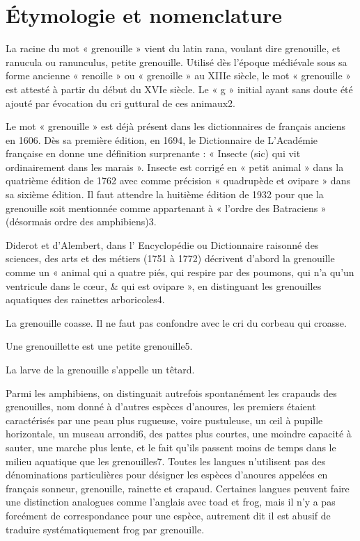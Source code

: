 \section{Étymologie et nomenclature}

La racine du mot « grenouille » vient du latin rana, voulant dire grenouille, et ranucula ou ranunculus, petite grenouille. Utilisé dès l'époque médiévale sous sa forme ancienne « renoille » ou « grenoille » au XIIIe siècle, le mot « grenouille » est attesté à partir du début du XVIe siècle. Le « g » initial ayant sans doute été ajouté par évocation du cri guttural de ces animaux2.

Le mot « grenouille » est déjà présent dans les dictionnaires de français anciens en 1606. Dès sa première édition, en 1694, le Dictionnaire de L'Académie française en donne une définition surprenante : « Insecte (sic) qui vit ordinairement dans les marais ». Insecte est corrigé en « petit animal » dans la quatrième édition de 1762 avec comme précision « quadrupède et ovipare » dans sa sixième édition. Il faut attendre la huitième édition de 1932 pour que la grenouille soit mentionnée comme appartenant à « l'ordre des Batraciens » (désormais ordre des amphibiens)3.

Diderot et d'Alembert, dans l' Encyclopédie ou Dictionnaire raisonné des sciences, des arts et des métiers (1751 à 1772) décrivent d'abord la grenouille comme un « animal qui a quatre piés, qui respire par des poumons, qui n'a qu'un ventricule dans le cœur, \& qui est ovipare », en distinguant les grenouilles aquatiques des rainettes arboricoles4.

La grenouille coasse. Il ne faut pas confondre avec le cri du corbeau qui croasse.

Une grenouillette est une petite grenouille5.

La larve de la grenouille s'appelle un têtard.

Parmi les amphibiens, on distinguait autrefois spontanément les crapauds des grenouilles, nom donné à d'autres espèces d'anoures, les premiers étaient caractérisés par une peau plus rugueuse, voire pustuleuse, un œil à pupille horizontale, un museau arrondi6, des pattes plus courtes, une moindre capacité à sauter, une marche plus lente, et le fait qu'ils passent moins de temps dans le milieu aquatique que les grenouilles7. Toutes les langues n'utilisent pas des dénominations particulières pour désigner les espèces d'anoures appelées en français sonneur, grenouille, rainette et crapaud. Certaines langues peuvent faire une distinction analogues comme l'anglais avec toad et frog, mais il n'y a pas forcément de correspondance pour une espèce, autrement dit il est abusif de traduire systématiquement frog par grenouille. 